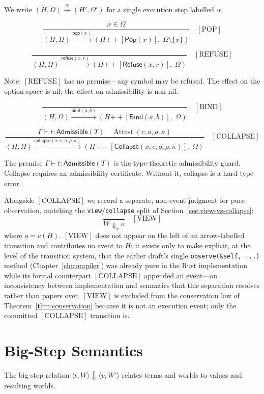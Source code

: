 \documentclass[12pt, a4paper, openany]{book}
\theoremstyle{plain}
\theoremstyle{definition}
\theoremstyle{remark}
\newcommand{\Pop}{\mathsf{Pop}}
\newcommand{\Refuse}{\mathsf{Refuse}}
\newcommand{\Bind}{\mathsf{Bind}}
\newcommand{\Collapse}{\mathsf{Collapse}}
\newcommand{\Adm}{\mathsf{Admissible}}
\begin{document}
We write $(H, \Omega) \xrightarrow{\alpha} (H', \Omega')$ for a single execution
step labelled $\alpha$.

\[
\frac{x \in \Omega}{(H, \Omega) \xrightarrow{\mathsf{pop}(x)} (H \mathbin{++} [\Pop(x)],\; \Omega \setminus \{x\})} \quad [\mathrm{POP}]
\]

\[
\frac{}{(H, \Omega) \xrightarrow{\mathsf{refuse}(x,r)} (H \mathbin{++} [\Refuse(x, r)],\; \Omega)} \quad [\mathrm{REFUSE}]
\]

Note: $[\mathrm{REFUSE}]$ has no premise---any symbol may be refused. The effect
on the option space is nil; the effect on admissibility is non-nil.

\[
\frac{}{(H, \Omega) \xrightarrow{\mathsf{bind}(a,b)} (H \mathbin{++} [\Bind(a, b)],\; \Omega)} \quad [\mathrm{BIND}]
\]

\[
\frac{\Gamma \vdash t : \Adm(T) \quad \operatorname{Attest}(c, o, \rho, \kappa)}{(H, \Omega) \xrightarrow{\mathsf{collapse}(x,c,o,\rho,\kappa)} (H \mathbin{++} [\Collapse(x, c, o, \rho, \kappa)],\; \Omega)} \quad [\mathrm{COLLAPSE}]
\]

The premise $\Gamma \vdash t : \Adm(T)$ is the type-theoretic admissibility guard.
Collapse requires an admissibility certificate. Without it, collapse is a hard
type error.

Alongside $[\mathrm{COLLAPSE}]$ we record a separate, non-event judgment for
pure observation, matching the \texttt{view}/\texttt{collapse} split of
Section~\ref{sec:view-vs-collapse}:
\[
\frac{}{W \Downarrow_c o} \quad [\mathrm{VIEW}]
\]
where $o = c(H)$. $[\mathrm{VIEW}]$ does not appear on the left of an
arrow-labelled transition and contributes no event to $H$; it exists only to
make explicit, at the level of the transition system, that the earlier draft's
single \texttt{observe(\&self, ...)} method (Chapter~\ref{ch:compiler}) was
already pure in the Rust implementation while its formal counterpart
$[\mathrm{COLLAPSE}]$ appended an event---an inconsistency between
implementation and semantics that this separation resolves rather than
papers over. $[\mathrm{VIEW}]$ is excluded from the conservation law of
Theorem~\ref{thm:conservation} because it is not an execution event; only the
committed $[\mathrm{COLLAPSE}]$ transition is.

\section{Big-Step Semantics}

The big-step relation $\langle t, W \rangle \Downarrow \langle v, W' \rangle$
relates terms and worlds to values and resulting worlds.
\end{document}
